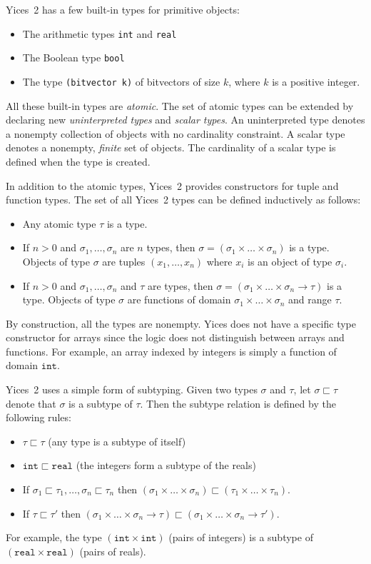 \documentclass[11pt,twoside,fleqn,openright,titlepage]{cslreport}
\begin{document}
Yices~2 has a few built-in types for primitive objects:
\begin{itemize}
\item The arithmetic types \texttt{int} and \texttt{real}
\item The Boolean type \texttt{bool}
\item The type \texttt{(bitvector k)} of bitvectors of size $k$,
 where $k$ is a positive integer.
\end{itemize}
All these built-in  types are {\em atomic\/}. The  set of atomic types
can be extended by declaring  new {\em uninterpreted types\/} and {\em
  scalar types\/}. An uninterpreted type denotes a nonempty collection
of objects  with no  cardinality constraint. A  scalar type  denotes a
nonempty, {\em finite\/}  set of objects. The cardinality  of a scalar
type is defined when the type is created.

\medskip\noindent
In  addition to the  atomic types,  Yices~2 provides  constructors for
tuple and function types. The set  of all Yices~2 types can be defined
inductively as follows:
\begin{itemize}
\item Any atomic type $\tau$ is a type.
\item  If $n>0$  and  $\sigma_1,\ldots,\sigma_n$ are  $n$ types,  then
  $\sigma   =  (\sigma_1   \times  \ldots   \times  \sigma_n)$   is  a
  type. Objects of type  $\sigma$ are tuples $(x_1,\ldots, x_n)$ where
  $x_i$ is an object of type $\sigma_i$.
\item If  $n>0$ and  $\sigma_1,\ldots,\sigma_n$ and $\tau$  are types,
  then  $\sigma  =  (\sigma_1\times  \ldots\times\sigma_n  \rightarrow
  \tau)$ is a  type. Objects of type $\sigma$  are functions of domain
  $\sigma_1\times\ldots\times\sigma_n$ and range $\tau$.
\end{itemize}
By construction,  all the  types are nonempty.  Yices does not  have a
specific  type  constructor  for  arrays  since  the  logic  does  not
distinguish  between  arrays  and  functions. For  example,  an  array
indexed by integers is simply a function of domain $\mathtt{int}$.

\medskip\noindent
Yices~2 uses a simple form  of subtyping. Given two types $\sigma$ and
$\tau$, let $\sigma\sqsubset\tau$ denote that $\sigma$ is a subtype of
$\tau$. Then the subtype relation is defined by the following rules:
\begin{itemize}
\item $\tau\sqsubset\tau$ (any type is a subtype of itself)
\item   $\mathtt{int}\sqsubset\mathtt{real}$  (the  integers   form  a
  subtype of the reals)
\item If $\sigma_1\sqsubset\tau_1,\ldots,\sigma_n\sqsubset\tau_n$ then
$(\sigma_1\times \ldots\times\sigma_n)\sqsubset (\tau_1\times\ldots\times\tau_n)$.
\item If $\tau\sqsubset\tau'$ then
  $(\sigma_1\times\ldots\times\sigma_n\rightarrow\tau)\sqsubset
  (\sigma_1\times\ldots\times\sigma_n\rightarrow\tau')$.
\end{itemize}
For  example, the  type  $(\mathtt{int}\times\mathtt{int})$ (pairs  of
integers) is a  subtype of $(\mathtt{real}\times\mathtt{real})$ (pairs
of reals).
\end{document}

